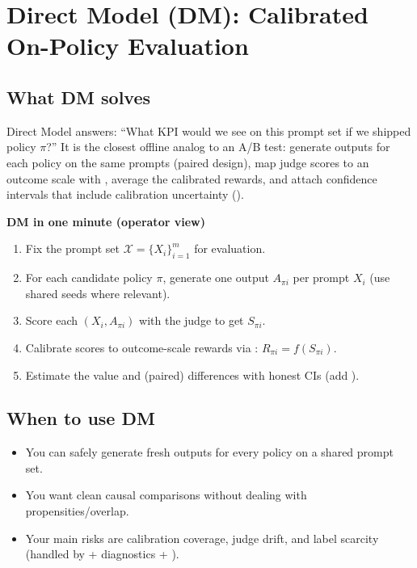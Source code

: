 \section{Direct Model (DM): Calibrated On-Policy Evaluation}

\subsection{What DM solves}

Direct Model answers: ``What KPI would we see on this prompt set if we shipped policy $\pi$?'' It is the closest offline analog to an A/B test: generate outputs for each policy on the same prompts (paired design), map judge scores to an outcome scale with \autocal, average the calibrated rewards, and attach confidence intervals that include calibration uncertainty (\oua).

\begin{quickref}
\textbf{DM in one minute (operator view)}
\begin{enumerate}
\item Fix the prompt set $\mathcal{X} = \{X_i\}_{i=1}^m$ for evaluation.
\item For each candidate policy $\pi$, generate one output $A_{\pi i}$ per prompt $X_i$ (use shared seeds where relevant).
\item Score each $(X_i, A_{\pi i})$ with the judge to get $S_{\pi i}$.
\item Calibrate scores to outcome-scale rewards via \autocal: $R_{\pi i} = f(S_{\pi i})$.
\item Estimate the value and (paired) differences with honest CIs (add \oua).
\end{enumerate}
\end{quickref}

\subsection{When to use DM}

\begin{itemize}
\item You can safely generate fresh outputs for every policy on a shared prompt set.
\item You want clean causal comparisons without dealing with propensities/overlap.
\item Your main risks are calibration coverage, judge drift, and label scarcity (handled by \autocal{} + diagnostics + \oua).
\end{itemize}

